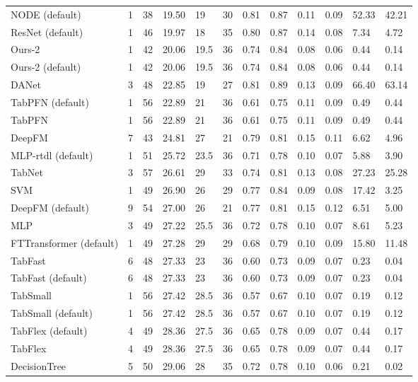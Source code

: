 \begin{tabular}{lllllrllllll}
NODE (default) & 1 & 38 & 19.50 & 19 & 30 & 0.81 & 0.87 & 0.11 & 0.09 & 52.33 & 42.21 \\
ResNet (default) & 1 & 46 & 19.97 & 18 & 35 & 0.80 & 0.87 & 0.14 & 0.08 & 7.34 & 4.72 \\
Ours-2 & 1 & 42 & 20.06 & 19.5 & 36 & 0.74 & 0.84 & 0.08 & 0.06 & 0.44 & 0.14 \\
Ours-2 (default) & 1 & 42 & 20.06 & 19.5 & 36 & 0.74 & 0.84 & 0.08 & 0.06 & 0.44 & 0.14 \\
DANet & 3 & 48 & 22.85 & 19 & 27 & 0.81 & 0.89 & 0.13 & 0.09 & 66.40 & 63.14 \\
TabPFN (default) & 1 & 56 & 22.89 & 21 & 36 & 0.61 & 0.75 & 0.11 & 0.09 & 0.49 & 0.44 \\
TabPFN & 1 & 56 & 22.89 & 21 & 36 & 0.61 & 0.75 & 0.11 & 0.09 & 0.49 & 0.44 \\
DeepFM & 7 & 43 & 24.81 & 27 & 21 & 0.79 & 0.81 & 0.15 & 0.11 & 6.62 & 4.96 \\
MLP-rtdl (default) & 1 & 51 & 25.72 & 23.5 & 36 & 0.71 & 0.78 & 0.10 & 0.07 & 5.88 & 3.90 \\
TabNet & 3 & 57 & 26.61 & 29 & 33 & 0.74 & 0.81 & 0.13 & 0.08 & 27.23 & 25.28 \\
SVM & 1 & 49 & 26.90 & 26 & 29 & 0.77 & 0.84 & 0.09 & 0.08 & 17.42 & 3.25 \\
DeepFM (default) & 9 & 54 & 27.00 & 26 & 21 & 0.77 & 0.81 & 0.15 & 0.12 & 6.51 & 5.00 \\
MLP & 3 & 49 & 27.22 & 25.5 & 36 & 0.72 & 0.78 & 0.10 & 0.07 & 8.61 & 5.23 \\
FTTransformer (default) & 1 & 49 & 27.28 & 29 & 29 & 0.68 & 0.79 & 0.10 & 0.09 & 15.80 & 11.48 \\
TabFast & 6 & 48 & 27.33 & 23 & 36 & 0.60 & 0.73 & 0.09 & 0.07 & 0.23 & 0.04 \\
TabFast (default) & 6 & 48 & 27.33 & 23 & 36 & 0.60 & 0.73 & 0.09 & 0.07 & 0.23 & 0.04 \\
TabSmall & 1 & 56 & 27.42 & 28.5 & 36 & 0.57 & 0.67 & 0.10 & 0.07 & 0.19 & 0.12 \\
TabSmall (default) & 1 & 56 & 27.42 & 28.5 & 36 & 0.57 & 0.67 & 0.10 & 0.07 & 0.19 & 0.12 \\
TabFlex (default) & 4 & 49 & 28.36 & 27.5 & 36 & 0.65 & 0.78 & 0.09 & 0.07 & 0.44 & 0.17 \\
TabFlex & 4 & 49 & 28.36 & 27.5 & 36 & 0.65 & 0.78 & 0.09 & 0.07 & 0.44 & 0.17 \\
DecisionTree & 5 & 50 & 29.06 & 28 & 35 & 0.72 & 0.78 & 0.10 & 0.06 & 0.21 & 0.02 \\

\end{tabular}
